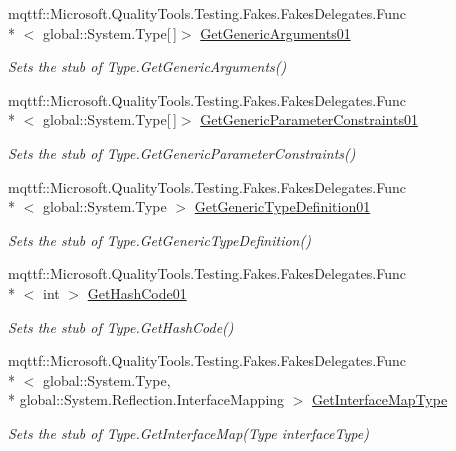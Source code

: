 \begin{DoxyCompactItemize}
mqttf\-::\-Microsoft.\-Quality\-Tools.\-Testing.\-Fakes.\-Fakes\-Delegates.\-Func\\*
$<$ global\-::\-System.\-Type\mbox{[}$\,$\mbox{]}$>$ \hyperlink{class_system_1_1_fakes_1_1_stub_type_a206fe27c0d105d414a1398cf8f1826f7}{Get\-Generic\-Arguments01}
\begin{DoxyCompactList}\small\item\em Sets the stub of Type.\-Get\-Generic\-Arguments()\end{DoxyCompactList}\item 
mqttf\-::\-Microsoft.\-Quality\-Tools.\-Testing.\-Fakes.\-Fakes\-Delegates.\-Func\\*
$<$ global\-::\-System.\-Type\mbox{[}$\,$\mbox{]}$>$ \hyperlink{class_system_1_1_fakes_1_1_stub_type_aa9ccf0d88e7c69d67b28e2e76edf1d6f}{Get\-Generic\-Parameter\-Constraints01}
\begin{DoxyCompactList}\small\item\em Sets the stub of Type.\-Get\-Generic\-Parameter\-Constraints()\end{DoxyCompactList}\item 
mqttf\-::\-Microsoft.\-Quality\-Tools.\-Testing.\-Fakes.\-Fakes\-Delegates.\-Func\\*
$<$ global\-::\-System.\-Type $>$ \hyperlink{class_system_1_1_fakes_1_1_stub_type_a33c8ddf5eb7be3b1f0f910fd28630b23}{Get\-Generic\-Type\-Definition01}
\begin{DoxyCompactList}\small\item\em Sets the stub of Type.\-Get\-Generic\-Type\-Definition()\end{DoxyCompactList}\item 
mqttf\-::\-Microsoft.\-Quality\-Tools.\-Testing.\-Fakes.\-Fakes\-Delegates.\-Func\\*
$<$ int $>$ \hyperlink{class_system_1_1_fakes_1_1_stub_type_accbb714368ca7128d9f36d772e09de00}{Get\-Hash\-Code01}
\begin{DoxyCompactList}\small\item\em Sets the stub of Type.\-Get\-Hash\-Code()\end{DoxyCompactList}\item 
mqttf\-::\-Microsoft.\-Quality\-Tools.\-Testing.\-Fakes.\-Fakes\-Delegates.\-Func\\*
$<$ global\-::\-System.\-Type, \\*
global\-::\-System.\-Reflection.\-Interface\-Mapping $>$ \hyperlink{class_system_1_1_fakes_1_1_stub_type_aa4d91c8b71269e017d7f7f851d8ca3b7}{Get\-Interface\-Map\-Type}
\begin{DoxyCompactList}\small\item\em Sets the stub of Type.\-Get\-Interface\-Map(\-Type interface\-Type)\end{DoxyCompactList}\item 

\end{DoxyCompactItemize}
